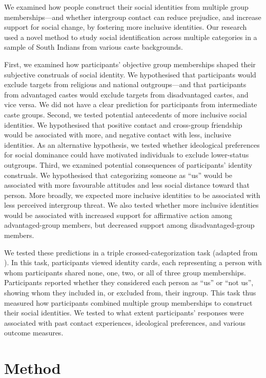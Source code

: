 \documentclass[12pt, a4paper]{article}
\begin{document}
We examined how people construct their social identities from multiple group memberships---and whether intergroup contact can reduce prejudice, and increase support for social change, by fostering more inclusive identities. Our research used a novel method to study social identification across multiple categories in a sample of South Indians from various caste backgrounds.

First, we examined how participants' objective group memberships shaped their subjective construals of social identity.  We hypothesised that participants would exclude targets from religious and national outgroups---and that participants from advantaged castes would exclude targets from disadvantaged castes, and vice versa. We did not have a clear prediction for participants from intermediate caste groups. Second, we tested potential antecedents of more inclusive social identities. We hypothesised that positive contact and cross-group friendship would be associated with more, and negative contact with less, inclusive identities. As an alternative hypothesis, we tested whether ideological preferences for social dominance \cite{sidanius_social_1999} could have motivated individuals to exclude lower-status outgroups. Third, we examined potential consequences of participants' identity construals. We hypothesised that categorizing someone as ``us'' would be associated with more favourable attitudes and less social distance toward that person. More broadly, we expected more inclusive identities to be associated with less perceived intergroup threat. We also tested whether more inclusive identities would be associated with increased support for affirmative action among advantaged-group members, but decreased support among disadvantaged-group members.

We tested these predictions in a triple crossed-categorization task (adapted from ). In this task, participants viewed identity cards, each representing a person with whom participants shared none, one, two, or all of three group memberships. Participants reported whether they considered each person as ``us'' or ``not us'', showing whom they included in, or excluded from, their ingroup. This task thus measured how participants combined multiple group memberships to construct their social identities. We tested to what extent participants' responses were associated with past contact experiences, ideological preferences, and various outcome measures.

\section{Method}
\end{document}
